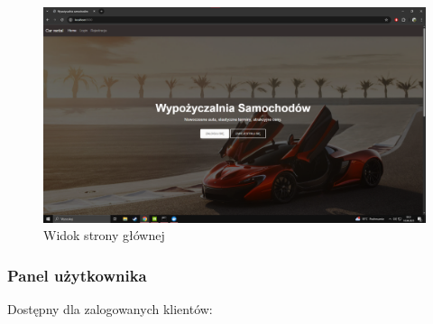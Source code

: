 \documentclass[12pt,a4paper]{article}
\begin{document}
\begin{figure}[H]
    \centering
    \includegraphics[width=1.1\textwidth]{public_panel.png}
    \caption{Widok strony głównej}
    \label{fig:user-panel}
\end{figure}

\subsubsection{Panel użytkownika}
Dostępny dla zalogowanych klientów:
\end{document}
